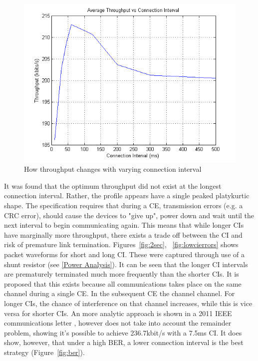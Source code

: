 \documentclass[]{article}
\begin{document}
\begin{figure}[H]
	\begin{center}
		\includegraphics[width = \textwidth]{civsdatarate}
	\end{center}
	\caption{How throughput changes with varying connection interval}
	\label{fig:civsdatarate}
\end{figure}

It was found that the optimum throughput did not exist at the longest connection interval. Rather, the profile appears have a single peaked platykurtic shape. The specification requires that during a \ac{CE}, transmission errors (e.g. a CRC error), should cause the devices to "give up", power down and wait until the next interval to begin communicating again. This means that while longer \ac{CI}s have marginally more throughput,  there exists a trade off between the \ac{CI} and risk of premature link termination. Figures~\ref{fig:2sec}, ~\ref{fig:lowcierrors} shows packet waveforms for short and long \ac{CI}. These were captured through use of a shunt resistor (see \ref{Power Analysis}). It can be seen that the longer \ac{CI} intervals are prematurely terminated much more frequently than the shorter \ac{CI}s. It is proposed that this exists because all communications takes place on the same channel during a single \ac{CE}. In the subsequent \ac{CE} the channel channel. For longer \ac{CI}s, the chance of interference on that channel increases, while this is vice versa for shorter \ac{CI}s. An more analytic approach is shown in a 2011 IEEE communications letter \cite{Gomez2011}, however does not take into account the remainder problem, showing it's possible to achieve 236.7kbit/s with a 7.5ms \ac{CI}. It does show, however, that under a high \ac{BER}, a lower connection interval is the best strategy (Figure~\ref{fig:ber}).
\end{document}
